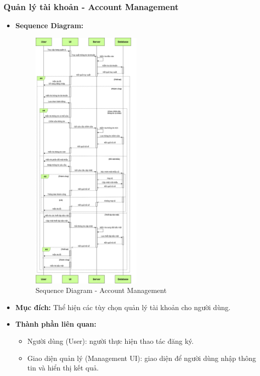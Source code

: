 \documentclass[a4paper]{article}
\begin{document}
\begin{itemize}
\end{itemize}

\subsubsection{Quản lý tài khoản - Account Management}
\begin{itemize}
	\item \textbf{Sequence Diagram:}
	      \begin{figure}[H]
		      \centering
		      \includegraphics[width=0.5\textwidth]{Images/account-management_sequence.png}
		      \caption{Sequence Diagram - Account Management}
	      \end{figure}
	\item \textbf{Mục đích:} Thể hiện các tùy chọn quản lý tài khoản cho người dùng.
	\item \textbf{Thành phần liên quan:}
	      \begin{itemize}
		      \item Người dùng (User): người thực hiện thao tác đăng ký.
		      \item Giao diện quản lý (Management UI): giao diện để người dùng nhập thông tin và hiển thị kết quả.

\end{itemize}
\end{itemize}
\end{document}
